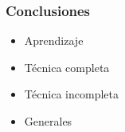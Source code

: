 \frame
{
\frametitle{Conclusiones}
\begin{itemize}
	\item Aprendizaje
	\item Técnica completa
	\item Técnica incompleta
	\item Generales
\end{itemize}
}
